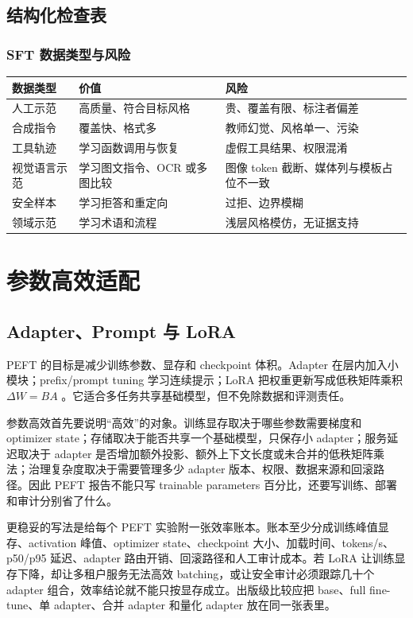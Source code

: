 \documentclass[UTF8,zihao=-4,openany]{ctexbook}
\begin{document}
\section{结构化检查表}
\subsection{SFT 数据类型与风险}
\begin{center}
\begin{tabular}{p{}p{}p{}}
\toprule
数据类型 & 价值 & 风险 \\
\midrule
人工示范 & 高质量、符合目标风格 & 贵、覆盖有限、标注者偏差 \\
合成指令 & 覆盖快、格式多 & 教师幻觉、风格单一、污染 \\
工具轨迹 & 学习函数调用与恢复 & 虚假工具结果、权限混淆 \\
视觉语言示范 & 学习图文指令、OCR 或多图比较 & 图像 token 截断、媒体列与模板占位不一致 \\
安全样本 & 学习拒答和重定向 & 过拒、边界模糊 \\
领域示范 & 学习术语和流程 & 浅层风格模仿，无证据支持 \\
\bottomrule
\end{tabular}
\end{center}

\chapter{参数高效适配}
\section{Adapter、Prompt 与 LoRA}
PEFT 的目标是减少训练参数、显存和 checkpoint 体积。Adapter 在层内加入小模块；prefix/prompt tuning 学习连续提示；LoRA 把权重更新写成低秩矩阵乘积 $\Delta W=BA$ \cite{hu2021lora}。它适合多任务共享基础模型，但不免除数据和评测责任。

参数高效首先要说明“高效”的对象。训练显存取决于哪些参数需要梯度和 optimizer state；存储取决于能否共享一个基础模型，只保存小 adapter；服务延迟取决于 adapter 是否增加额外投影、额外上下文长度或未合并的低秩矩阵乘法；治理复杂度取决于需要管理多少 adapter 版本、权限、数据来源和回滚路径。因此 PEFT 报告不能只写 trainable parameters 百分比，还要写训练、部署和审计分别省了什么。

更稳妥的写法是给每个 PEFT 实验附一张效率账本。账本至少分成训练峰值显存、activation 峰值、optimizer state、checkpoint 大小、加载时间、tokens/s、p50/p95 延迟、adapter 路由开销、回滚路径和人工审计成本。若 LoRA 让训练显存下降，却让多租户服务无法高效 batching，或让安全审计必须跟踪几十个 adapter 组合，效率结论就不能只按显存成立。出版级比较应把 base、full fine-tune、单 adapter、合并 adapter 和量化 adapter 放在同一张表里。
\end{document}
